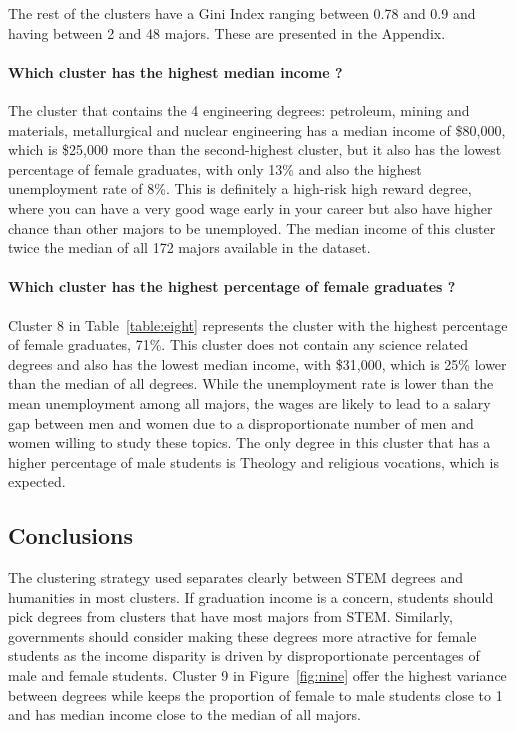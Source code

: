\documentclass[11pt]{article}
\begin{document}
The rest of the clusters have a Gini Index ranging between 0.78 and 0.9 and having between 2 and 48 majors. These are presented in the Appendix.

\paragraph*{Which cluster has the highest median income ?}
The cluster that contains the 4 engineering degrees: petroleum, mining and materials, metallurgical and nuclear engineering has a median income of \$80,000, which is \$25,000 more than the second-highest cluster, but it also has the lowest percentage of female graduates, with only 13\% and also the highest unemployment rate of 8\%. This is definitely a high-risk high reward degree, where you can have a very good wage early in your career but also have higher chance than other majors to be unemployed. The median income of this cluster twice the median of all 172 majors available in the dataset.

\paragraph*{Which cluster has the highest percentage of female graduates ?}

Cluster 8 in Table~\ref{table:eight} represents the cluster with the highest percentage of female graduates, 71\%. This cluster does not contain any science related degrees and also has the lowest median income, with \$31,000, which is 25\% lower than the median of all degrees. While the unemployment rate is lower than the mean unemployment among all majors, the wages are likely to lead to a salary gap between men and women due to a disproportionate number of men and women willing to study these topics. The only degree in this cluster that has a higher percentage of male students is Theology and religious vocations, which is expected.

\subsection*{Conclusions}
The clustering strategy used separates clearly between STEM degrees and humanities in most clusters. If graduation income is a concern, students should pick degrees from clusters that have most majors from STEM. Similarly, governments should consider making these degrees more atractive for female students as the income disparity is driven by disproportionate percentages of male and female students. Cluster 9 in Figure~\ref{fig:nine} offer the highest variance between degrees while keeps the proportion of female to male students close to 1 and has median income close to the median of all majors.  
\end{document}
